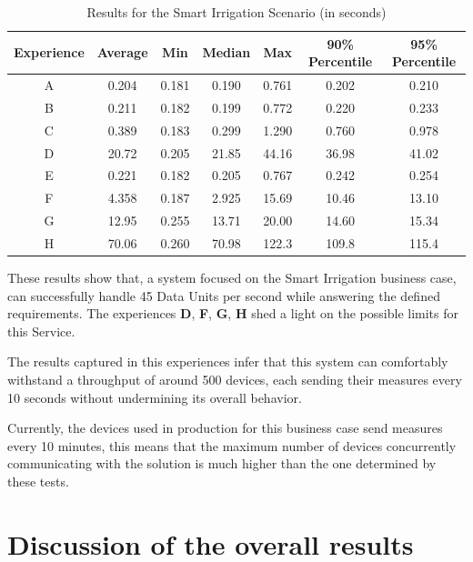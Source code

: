 \begin{table}[H]
    \caption{Results for the Smart Irrigation Scenario (in seconds)}
    \label{tab:evaluation:experiences:irrigation:results}
    \centering
    \begin{tabular}{@{}ccccccc@{}}
    \toprule
    \textbf{Experience} & \textbf{Average} & \textbf{Min} & \textbf{Median} & \textbf{Max} & \textbf{90\% Percentile} & \textbf{95\% Percentile} \\ \midrule
    A & 0.204 & 0.181 & 0.190 & 0.761 & 0.202 & 0.210 \\ \midrule
    B & 0.211 & 0.182 & 0.199 & 0.772 & 0.220 & 0.233 \\ \midrule
    C & 0.389 & 0.183 & 0.299 & 1.290 & 0.760 & 0.978 \\ \midrule
    D & 20.72 & 0.205 & 21.85 & 44.16 & 36.98 & 41.02 \\ \midrule
    E & 0.221 & 0.182 & 0.205 & 0.767 & 0.242 & 0.254 \\ \midrule
    F & 4.358 & 0.187 & 2.925 & 15.69 & 10.46 & 13.10 \\ \midrule
    G & 12.95 & 0.255 & 13.71 & 20.00 & 14.60 & 15.34 \\ \midrule
    H & 70.06 & 0.260 & 70.98 & 122.3 & 109.8 & 115.4 \\ \bottomrule
    \end{tabular}
\end{table}

These results show that, a system focused on the Smart Irrigation business case, can successfully handle 45 Data Units per second while answering the defined requirements. The experiences \textbf{D}, \textbf{F}, \textbf{G}, \textbf{H} shed a light on the possible limits for this Service.

The results captured in this experiences infer that this system can comfortably withstand a throughput of around 500 devices, each sending their measures every 10 seconds without undermining its overall behavior.

Currently, the devices used in production for this business case send measures every 10 minutes, this means that the maximum number of devices concurrently communicating with the solution is much higher than the one determined by these tests.

\section{Discussion of the overall results}
\label{subsubsec:evaluation:overview}


